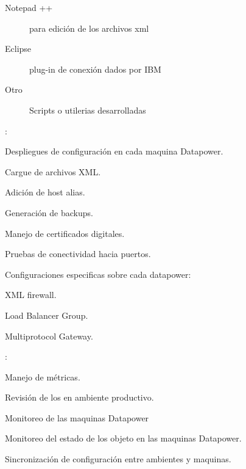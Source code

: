 \begin{description}
	\begin{description}
		\item [Notepad ++] para edición de los archivos xml
		\item [Eclipse] plug-in de conexión dados por IBM
		\item [Otro] Scripts o utilerias desarrolladas
	\end{description}
\item [Operaciones frecuentemente realizadas]:
	\begin{description}
		\item Despliegues de configuración en cada maquina Datapower.
		\item Cargue de archivos XML.
		\item Adición de host alias.
		\item Generación de backups.
		\item Manejo de certificados digitales.
		\item Pruebas de conectividad hacia puertos.
		\item Configuraciones especificas sobre cada datapower:
		\begin{description}
			\item XML firewall.
			\item Load Balancer Group.
			\item Multiprotocol Gateway.
		\end{description}
	\end{description}
\item [Difilcutades Identificadas]:
	\begin{description}
		\item Manejo de métricas.
		\item Revisión de los en ambiente productivo.
		\item Monitoreo de las maquinas Datapower
		\item Monitoreo del estado de los objeto en las maquinas Datapower.
		\item Sincronización de configuración entre ambientes y maquinas.
	\end{description}
\end{description}

